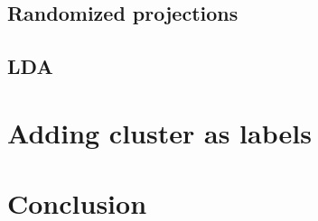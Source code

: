 \documentclass[twocolumn,a4paper,10pt]{article}
\begin{document}
\subsection{Randomized projections}
\paragraph{}
\subsection{LDA}
\paragraph{}

\section{Adding cluster as labels}

\section{Conclusion}
\end{document}
